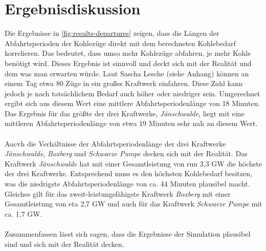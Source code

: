 \section{Ergebnisdiskussion}

Die Ergebnisse in \autoref{fig:results-departures} zeigen, dass die Längen der Abfahrtsperioden der Kohlezüge direkt mit dem berechneten Kohlebedarf korrelieren. Das bedeutet, dass umso mehr Kohlezüge abfahren, je mehr Kohle benötigt wird. Dieses Ergebnis ist sinnvoll und deckt sich mit der Realität und dem was man erwarten würde. Laut Sascha Lesche (siehe Anhang) können an einem Tag etwa 80 Züge in ein großes Kraftwerk einfahren. Diese Zahl kann jedoch je nach tatsächlichem Bedarf auch höher oder niedriger sein. Umgerechnet ergibt sich aus diesem Wert eine mittlere Abfahrtsperiodenlänge von 18 Minuten. Das Ergebnis für das größte der drei Kraftwerke, \emph{Jänschwalde}, liegt mit eine mittleren Abfahrtsperiodenlänge von etwa 19 Minuten sehr nah an diesem Wert. \\
\\
Aucvh die Verhältnisse der Abfahrtsperiodenlänge der drei Kraftwerke \emph{Jänschwalde}, \emph{Boxberg} und \emph{Schwarze Pumpe} decken sich mit der Realität. Das Kraftwerk \emph{Jänschwalde} hat mit einer Gesamtleistung von run 3,3 GW die höchste der drei Kraftwerke. Entsprechend muss es den höchsten Kohlebedarf besitzen, was die niedrigste Abfahrtsperiodenlänge von ca. 44 Minuten plausibel macht. Gleiches gilt für das zweit-leistungsfähigste Kraftwerk \emph{Boxberg} mit einer Gesamtleistung von eta 2,7 GW und auch für das Kraftwerk \emph{Schwarze Pumpe} mit ca. 1,7 GW. \cite{noauthor_bundesnetzagentur_nodate}\\
\\
Zusammenfassen lässt sich sagen, dass die Ergebnisse der Simulation plausibel sind und sich mit der Realität decken.